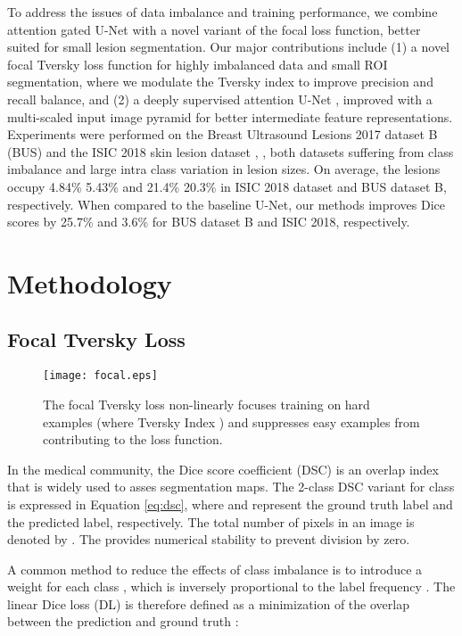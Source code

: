 \documentclass{article}
\begin{document}
To address the issues of data imbalance and training performance, we combine attention gated U-Net with a novel variant of the focal loss function, better suited for small lesion segmentation. Our major contributions include (1) a novel focal Tversky loss function for highly imbalanced data and small ROI segmentation, where we modulate the Tversky index \cite{tversky} to improve precision and recall balance, and (2) a deeply supervised attention U-Net \cite{oktay}, improved with a multi-scaled input image pyramid for better intermediate feature representations. Experiments were performed on the Breast Ultrasound Lesions 2017 dataset B (BUS) \cite{yap} and the ISIC 2018 skin lesion dataset \cite{isic1}, \cite{isic2}, both datasets suffering from class imbalance and large intra class variation in lesion sizes. On average, the lesions occupy 4.84\%  5.43\% and 21.4\%  20.3\% in ISIC 2018 dataset and BUS dataset B, respectively. When compared to the baseline U-Net, our methods improves Dice scores by 25.7\% and 3.6\% for BUS dataset B and ISIC 2018, respectively.

\section{Methodology}

\subsection{Focal Tversky Loss}

\begin{figure}[h]
	\centering
	\texttt{[image: focal.eps]}	
	\caption{The focal Tversky loss non-linearly focuses training on hard examples (where Tversky Index ) and suppresses easy examples from contributing to the loss function. }
	\label{fig:focal}
\end{figure}    

In the medical community, the Dice score coefficient (DSC) is an overlap index that is widely used to asses segmentation maps. The 2-class DSC variant for class  is expressed in Equation \ref{eq:dsc}, where    and  represent the ground truth label and the predicted label, respectively. The total number of pixels in an image is denoted by . The  provides numerical stability to prevent division by zero. 



A common method to reduce the effects of class imbalance is to introduce a weight  for each class , which is inversely proportional to the label frequency \cite{wong}.  The linear Dice loss (DL) is therefore defined as a minimization of the overlap between the prediction and ground truth \cite{milletari}: 
\end{document}

